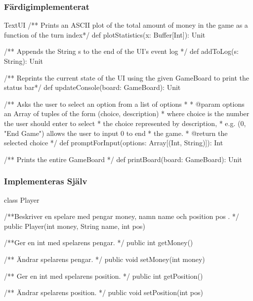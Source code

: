 \subsubsection{Färdigimplementerat}

\begin{ScalaSpec}{TextUI}
   /** Prints an ASCII plot of the total amount 
	of money in the game as a function of the turn index*/
  def plotStatistics(x: Buffer[Int]): Unit

  /** Appends the String s to the end of the UI's event log */
  def addToLog(s: String): Unit 

  /** Reprints the current state of the UI using the given
	GameBoard to print the status bar*/
  def updateConsole(board: GameBoard): Unit 

 
  /** Asks the user to select an option from a list of options
    *
    * @param options an Array of tuples of the form (choice, description)
    *                where choice is the number the user should enter to select 
    *                the choice represented by description,
    *                e.g. (0,  "End Game") allows the user to input 0 to end 
    *                the game.
    * @return        the selected choice
    */
  def promptForInput(options: Array[(Int, String)]): Int 

  /** Prints the entire GameBoard */
  def printBoard(board: GameBoard): Unit 

 
\end{ScalaSpec}



\subsubsection{Implementeras Själv}
\begin{JavaSpec}{class Player}

/**Beskriver en spelare med pengar money, namn name och position pos . */
public Player(int money, String name, int pos)

/**Ger en int med spelarens pengar. */
public int getMoney()

/** Ändrar spelarens pengar. */
public void setMoney(int money)

/** Ger en int med spelarens position. */
public int getPosition()

/** Ändrar spelarens position. */
public void setPosition(int pos)

\end{JavaSpec}

